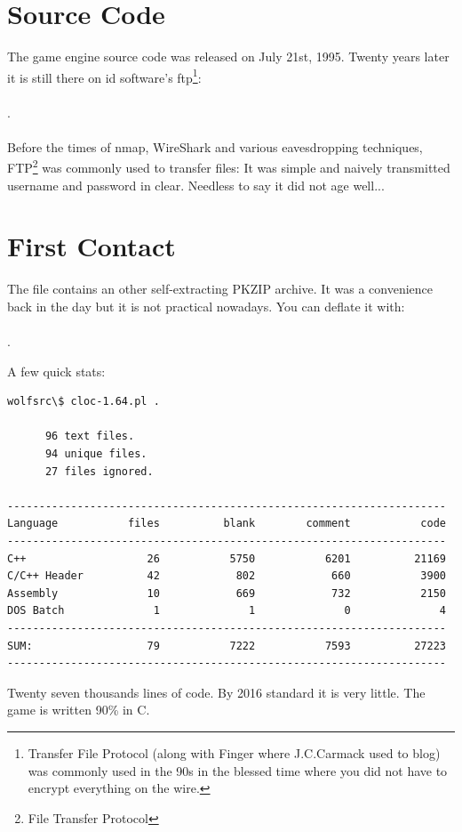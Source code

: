 \documentclass[book.tex]{subfiles}
\begin{document}
\section{Source Code}
The game engine source code was released on July 21st, 1995. Twenty years later it is still there on id software's ftp\footnote{Transfer File Protocol (along with Finger where J.C.Carmack used to blog) was commonly used in the 90s in the blessed time where you did not have to encrypt everything on the wire.}:\\ 
\\.\\
\\
 Before the times of nmap, WireShark and various eavesdropping techniques, FTP\footnote{File Transfer Protocol} was commonly used to transfer files: It was simple and naively transmitted username and password in clear. Needless to say it did not age well...\\

\section{First Contact}
The file  contains an other self-extracting PKZIP archive. It was a convenience back in the day but it is not practical nowadays. You can deflate it with:\\
\\.\\
\par
A few quick stats:\\

\begin{minipage}{\textwidth}
\begin{verbatim}
wolfsrc\$ cloc-1.64.pl .

      96 text files.
      94 unique files.                              
      27 files ignored.

---------------------------------------------------------------------
Language           files          blank        comment           code
---------------------------------------------------------------------
C++                   26           5750           6201          21169
C/C++ Header          42            802            660           3900
Assembly              10            669            732           2150
DOS Batch              1              1              0              4
---------------------------------------------------------------------
SUM:                  79           7222           7593          27223
---------------------------------------------------------------------
\end{verbatim}
\end{minipage}
Twenty seven thousands lines of code. By 2016 standard it is very little. The game is written 90\% in C.\\
\end{document}
